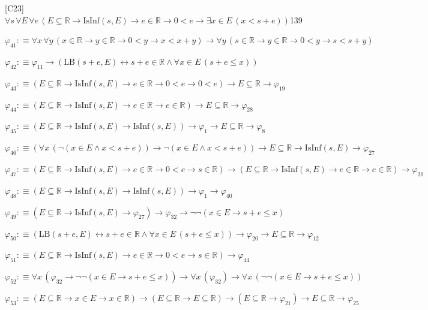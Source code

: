 \begin{fullproof}{[C23]}{$\forall s\,\forall E\,\forall e\,(E \subseteq \mathbb{R} \to \mathrm{IsInf}(s,E) \to e \in \mathbb{R} \to 0 < e \to \exists x \in E\,(x < s + e))$}{139}
\begin{abbrevlist}
\item $\varphi_{41} :\equiv \forall x\,\forall y\,(x \in \mathbb{R} \to y \in \mathbb{R} \to 0 < y \to x < x + y) \to \forall y\,(s \in \mathbb{R} \to y \in \mathbb{R} \to 0 < y \to s < s + y)$
\item $\varphi_{42} :\equiv \varphi_{11} \to (\mathrm{LB}(s + e,E) \leftrightarrow s + e \in \mathbb{R} \land \forall x \in E\,(s + e \leq x))$
\item $\varphi_{43} :\equiv (E \subseteq \mathbb{R} \to \mathrm{IsInf}(s,E) \to e \in \mathbb{R} \to 0 < e \to 0 < e) \to E \subseteq \mathbb{R} \to \varphi_{19}$
\item $\varphi_{44} :\equiv (E \subseteq \mathbb{R} \to \mathrm{IsInf}(s,E) \to e \in \mathbb{R} \to e \in \mathbb{R}) \to E \subseteq \mathbb{R} \to \varphi_{28}$
\item $\varphi_{45} :\equiv (E \subseteq \mathbb{R} \to \mathrm{IsInf}(s,E) \to \mathrm{IsInf}(s,E)) \to \varphi_{1} \to E \subseteq \mathbb{R} \to \varphi_{8}$
\item $\varphi_{46} :\equiv (\forall x\,(\neg (x \in E \land x < s + e)) \to \neg (x \in E \land x < s + e)) \to E \subseteq \mathbb{R} \to \mathrm{IsInf}(s,E) \to \varphi_{27}$
\item $\varphi_{47} :\equiv (E \subseteq \mathbb{R} \to \mathrm{IsInf}(s,E) \to e \in \mathbb{R} \to 0 < e \to s \in \mathbb{R}) \to (E \subseteq \mathbb{R} \to \mathrm{IsInf}(s,E) \to e \in \mathbb{R} \to e \in \mathbb{R}) \to \varphi_{20}$
\item $\varphi_{48} :\equiv (E \subseteq \mathbb{R} \to \mathrm{IsInf}(s,E) \to \mathrm{IsInf}(s,E)) \to \varphi_{1} \to \varphi_{40}$
\item $\varphi_{49} :\equiv (E \subseteq \mathbb{R} \to \mathrm{IsInf}(s,E) \to \varphi_{27}) \to \varphi_{32} \to \neg \neg (x \in E \to s + e \leq x)$
\item $\varphi_{50} :\equiv (\mathrm{LB}(s + e,E) \leftrightarrow s + e \in \mathbb{R} \land \forall x \in E\,(s + e \leq x)) \to \varphi_{20} \to E \subseteq \mathbb{R} \to \varphi_{12}$
\item $\varphi_{51} :\equiv (E \subseteq \mathbb{R} \to \mathrm{IsInf}(s,E) \to e \in \mathbb{R} \to 0 < e \to s \in \mathbb{R}) \to \varphi_{44}$
\item $\varphi_{52} :\equiv \forall x\,(\varphi_{32} \to \neg \neg (x \in E \to s + e \leq x)) \to \forall x\,(\varphi_{32}) \to \forall x\,(\neg \neg (x \in E \to s + e \leq x))$
\item $\varphi_{53} :\equiv (E \subseteq \mathbb{R} \to x \in E \to x \in \mathbb{R}) \to (E \subseteq \mathbb{R} \to E \subseteq \mathbb{R}) \to (E \subseteq \mathbb{R} \to \varphi_{21}) \to E \subseteq \mathbb{R} \to \varphi_{25}$

\end{abbrevlist}
\end{fullproof}
